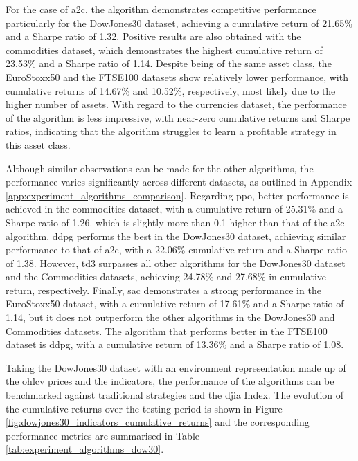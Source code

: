 

For the case of \acrshort{a2c}, the algorithm demonstrates competitive performance particularly for the DowJones30 dataset, achieving a cumulative return of 21.65\% and a Sharpe ratio of 1.32. Positive results are also obtained with the commodities dataset, which demonstrates the highest cumulative return of 23.53\% and a Sharpe ratio of 1.14. Despite being of the same asset class, the EuroStoxx50 and the FTSE100 datasets show relatively lower performance, with cumulative returns of 14.67\% and 10.52\%, respectively, most likely due to the higher number of assets. With regard to the currencies dataset, the performance of the algorithm is less impressive, with near-zero cumulative returns and Sharpe ratios, indicating that the algorithm struggles to learn a profitable strategy in this asset class.

Although similar observations can be made for the other algorithms, the performance varies significantly across different datasets, as outlined in Appendix \ref{app:experiment_algorithms_comparison}. Regarding \acrshort{ppo}, better performance is achieved in the commodities dataset, with a cumulative return of 25.31\% and a Sharpe ratio of 1.26. which is slightly more than 0.1 higher than that of the \acrshort{a2c} algorithm. \acrshort{ddpg} performs the best in the DowJones30 dataset, achieving similar performance to that of \acrshort{a2c}, with a 22.06\% cumulative return and a Sharpe ratio of 1.38. However, \acrshort{td3} surpasses all other algorithms for the DowJones30 dataset and the Commodities datasets, achieving 24.78\% and 27.68\% in cumulative return, respectively. Finally, \acrshort{sac} demonstrates a strong performance in the EuroStoxx50 dataset, with a cumulative return of 17.61\% and a Sharpe ratio of 1.14, but it does not outperform the other algorithms in the DowJones30 and Commodities datasets. The algorithm that performs better in the FTSE100 dataset is \acrshort{ddpg}, with a cumulative return of 13.36\% and a Sharpe ratio of 1.08.


Taking the DowJones30 dataset with an environment representation made up of the \acrshort{ohlcv} prices and the indicators, the performance of the algorithms can be benchmarked against traditional strategies and the \acrshort{djia} Index. The evolution of the cumulative returns over the testing period is shown in Figure \ref{fig:dowjones30_indicators_cumulative_returns} and the corresponding performance metrics are summarised in Table \ref{tab:experiment_algorithms_dow30}.

